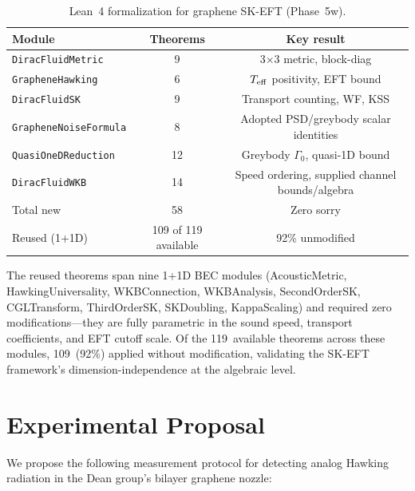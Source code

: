 \documentclass[aps,prd,twocolumn,showpacs,superscriptaddress,nofootinbib]{revtex4-2}
\begin{document}
\begin{table}[t]
\caption{Lean~4 formalization for graphene SK-EFT (Phase~5w).}
\label{tab:lean}
\begin{ruledtabular}
\begin{tabular}{lcc}
Module & Theorems & Key result \\
\hline
\texttt{DiracFluidMetric} & 9 & 3$\times$3 metric, block-diag \\
\texttt{GrapheneHawking} & 6 & $T_{\rm eff}$ positivity, EFT bound \\
\texttt{DiracFluidSK} & 9 & Transport counting, WF, KSS \\
\texttt{GrapheneNoiseFormula} & 8 & Adopted PSD/greybody scalar identities \\
\texttt{QuasiOneDReduction} & 12 & Greybody $\Gamma_0$, quasi-1D bound \\
\texttt{DiracFluidWKB} & 14 & Speed ordering, supplied channel bounds/algebra \\
\hline
Total new & 58 & Zero sorry \\
Reused (1+1D) & 109 of 119 available & 92\% unmodified \\
\end{tabular}
\end{ruledtabular}
\end{table}

The reused theorems span nine 1+1D BEC modules (AcousticMetric,
HawkingUniversality, WKBConnection, WKBAnalysis, SecondOrderSK,
CGLTransform, ThirdOrderSK, SKDoubling, KappaScaling) and required zero modifications---they
are fully parametric in the sound speed, transport coefficients, and EFT
cutoff scale. Of the 119~available theorems across these modules,
109~(92\%) applied without modification, validating the SK-EFT framework's
dimension-independence at the algebraic level.

\section{Experimental Proposal}
\label{sec:proposal}

We propose the following measurement protocol for detecting analog Hawking
radiation in the Dean group's bilayer graphene nozzle:
\end{document}
